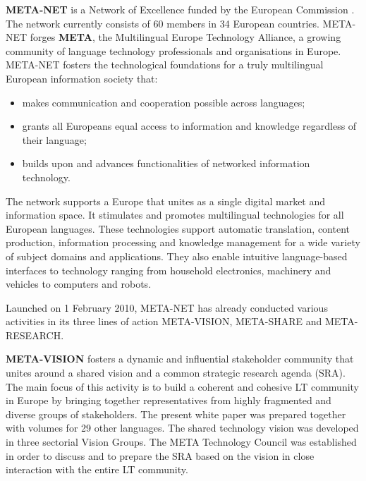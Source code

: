 
\begin{multicols}{2}
\textbf{META-NET} is a Network of Excellence funded by the European Commission \cite{rehm2011}.  The network currently consists of 60 members in 34 European countries. META-NET forges \textbf{META}, the Multilingual Europe Technology Alliance, a growing community of language technology professionals and organisations in Europe. META-NET fosters the technological foundations for a truly multilingual European information society that:

\begin{itemize}
\item makes communication and cooperation possible across languages;
\item grants all Europeans equal access to information and knowledge regardless of their language; 
\item builds upon and advances functionalities of networked information technology.
\end{itemize}

The network supports a Europe that unites as a single digital market and information space. It stimulates and promotes multilingual technologies for all European languages. These technologies support automatic translation, content production, information processing and knowledge management for a wide variety of subject domains and applications. They also enable intuitive language-based interfaces to technology ranging from household electronics, machinery and vehicles to computers and robots.

Launched on 1 February 2010, META-NET has already conducted various activities in its three lines of action META-VISION, META-SHARE and META-RESEARCH. 

\textbf{META-VISION} fosters a dynamic and influential stakeholder community that unites around a shared vision and a common strategic research agenda (SRA). The main focus of this activity is to build a coherent and cohesive LT community in Europe by bringing together representatives from highly fragmented and diverse groups of stakeholders. The present white paper was prepared together with volumes for 29 other languages. The shared technology vision was developed in three sectorial Vision Groups. The META Technology Council was established in order to discuss and to prepare the SRA based on the vision in close interaction with the entire LT community.


\end{multicols}
